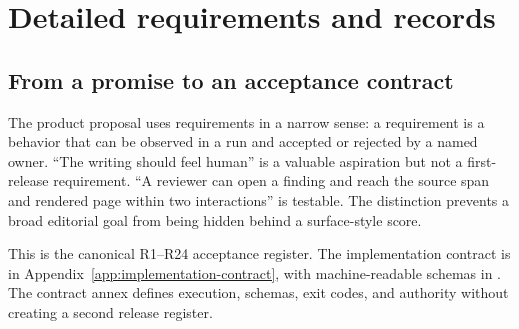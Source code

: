 \section{Detailed requirements and records}
\label{app:requirements}

\subsection{From a promise to an acceptance contract}

The product proposal uses requirements in a narrow sense: a requirement is a
behavior that can be observed in a run and accepted or rejected by a named
owner. ``The writing should feel human'' is a valuable aspiration but not a
first-release requirement. ``A reviewer can open a finding and reach the
source span and rendered page within two interactions'' is testable. The
distinction prevents a broad editorial goal from being hidden behind a
surface-style score.

This is the canonical R1--R24 acceptance register. The implementation contract
is in Appendix~\ref{app:implementation-contract}, with machine-readable
schemas in . The contract annex defines execution, schemas,
exit codes, and authority without creating a second release register.

